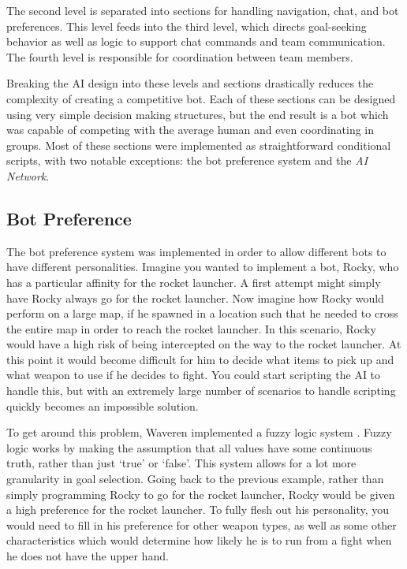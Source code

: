 The second level is separated into sections for handling navigation, chat, and bot preferences. This level feeds into the third level, which directs goal-seeking behavior as well as logic to support chat commands and team communication. The fourth level is responsible for coordination between team members.

Breaking the AI design into these levels and sections drastically reduces the complexity of creating a competitive bot. Each of these sections can be designed using very simple decision making structures, but the end result is a bot which was capable of competing with the average human and even coordinating in groups. Most of these sections were implemented as straightforward conditional scripts, with two notable exceptions: the bot preference system and the \emph{AI Network}.

\subsection{Bot Preference}

The bot preference system was implemented in order to allow different bots to have different personalities. Imagine you wanted to implement a bot, Rocky, who has a particular affinity for the rocket launcher. A first attempt might simply have Rocky always go for the rocket launcher. Now imagine how Rocky would perform on a large map, if he spawned in a location such that he needed to cross the entire map in order to reach the rocket launcher. In this scenario, Rocky would have a high risk of being intercepted on the way to the rocket launcher. At this point it would become difficult for him to decide what items to pick up and what weapon to use if he decides to fight. You could start scripting the AI to handle this, but with an extremely large number of scenarios to handle scripting quickly becomes an impossible solution.

To get around this problem, Waveren implemented a fuzzy logic system \cite{q3bot}. Fuzzy logic works by making the assumption that all values have some continuous truth, rather than just `true' or `false'. This system allows for a lot more granularity in goal selection. Going back to the previous example, rather than simply programming Rocky to go for the rocket launcher, Rocky would be given a high preference for the rocket launcher. To fully flesh out his personality, you would need to fill in his preference for other weapon types, as well as some other characteristics which would determine how likely he is to run from a fight when he does not have the upper hand.

